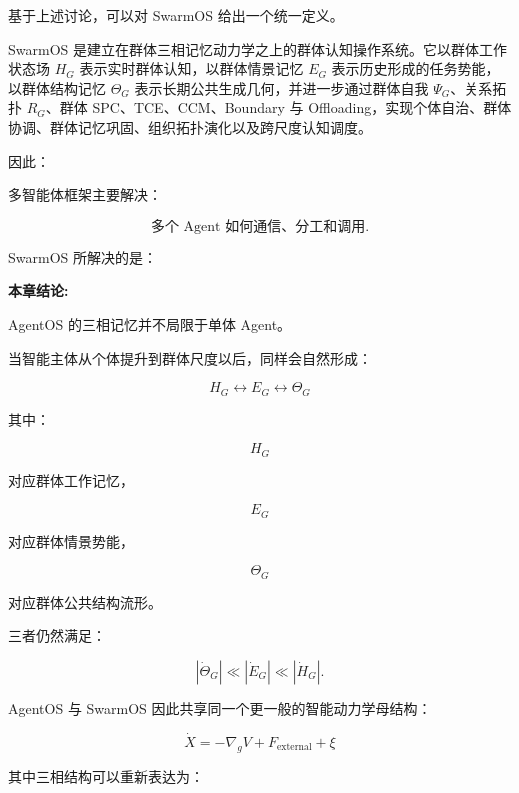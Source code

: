 基于上述讨论，可以对 SwarmOS 给出一个统一定义。

\begin{statementbox}
SwarmOS 是建立在群体三相记忆动力学之上的群体认知操作系统。它以群体工作状态场 $H_G$ 表示实时群体认知，以群体情景记忆 $E_G$ 表示历史形成的任务势能，以群体结构记忆 $\Theta_G$ 表示长期公共生成几何，并进一步通过群体自我 $\Psi_G$、关系拓扑 $R_G$、群体 SPC、TCE、CCM、Boundary 与 Offloading，实现个体自治、群体协调、群体记忆巩固、组织拓扑演化以及跨尺度认知调度。
\end{statementbox}

因此：

\begin{statementbox}
\centering
{}
\end{statementbox}

多智能体框架主要解决：

\[
\text{多个 Agent 如何通信、分工和调用}.
\]

SwarmOS 所解决的是：

\begin{statementbox}
\centering
{}
\end{statementbox}


\textbf{本章结论:}

AgentOS 的三相记忆并不局限于单体 Agent。

当智能主体从个体提升到群体尺度以后，同样会自然形成：

\[
\boxed{
H_G
\leftrightarrow
E_G
\leftrightarrow
\Theta_G
}
\]

其中：

\[
H_G
\]

对应群体工作记忆，

\[
E_G
\]

对应群体情景势能，

\[
\Theta_G
\]

对应群体公共结构流形。

三者仍然满足：

\[
|\dot{\Theta}_G|
\ll
|\dot E_G|
\ll
|\dot H_G|.
\]

AgentOS 与 SwarmOS 因此共享同一个更一般的智能动力学母结构：

\[
\boxed{
\dot X
=
-\nabla_gV
+
F_{\mathrm{external}}
+
\xi
}
\]

其中三相结构可以重新表达为：

